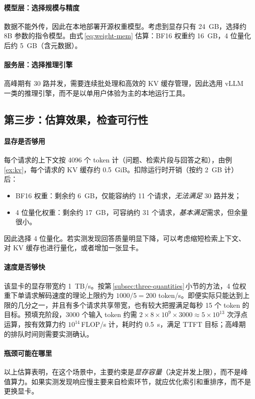 \paragraph{模型层：选择规模与精度} 数据不能外传，因此在本地部署开源权重模型。考虑到显存只有 \SI{24}{GB}，选择约 8B 参数的指令模型。由式\,\eqref{eq:weight-mem} 估算：BF16 权重约 \SI{16}{GB}，4 位量化后约 \SI{5}{GB}（含元数据）。

\paragraph{服务层：选择推理引擎} 高峰期有 30 路并发，需要连续批处理和高效的 KV 缓存管理，因此选用 vLLM 一类的推理引擎，而不是以单用户体验为主的本地运行工具。

\subsection{第三步：估算效果，检查可行性}

\paragraph{显存是否够用} 每个请求的上下文按 4096 个 token 计（问题、检索片段与回答之和），由例\,\ref{ex:kv}，每个请求的 KV 缓存约 \SI{0.5}{GiB}。扣除运行时开销（按约 \SI{2}{GB} 计）后：
\begin{itemize}
  \item BF16 权重：剩余约 \SI{6}{GB}，仅能容纳约 11 个请求，\emph{无法满足} 30 路并发；
  \item 4 位量化权重：剩余约 \SI{17}{GB}，可容纳约 31 个请求，\emph{基本满足}需求，但余量很小。
\end{itemize}
因此选择 4 位量化。若实测发现回答质量明显下降，可以考虑缩短检索上下文、对 KV 缓存也进行量化，或者增加一张显卡。

\paragraph{速度是否够快} 该显卡的显存带宽约 \SI{1}{TB/s}。按第\,\ref{subsec:three-quantities}\,小节的方法，4 位权重下单请求解码速度的理论上限约为 $1000/5=200$ token/s。即便实际只能达到上限的几分之一，并且有多个请求共享带宽，也有较大把握满足每秒 15 个 token 的目标。预填充阶段，3000 个输入 token 约需 $2\times8\times10^{9}\times3000\approx5\times10^{13}$ 次浮点运算，按有效算力约 $10^{14}$\,FLOP/s 计，耗时约 \SI{0.5}{s}，满足 TTFT 目标；高峰期的排队时间则需要实测确认。

\paragraph{瓶颈可能在哪里} 以上估算表明，在这个场景中，主要约束是\emph{显存容量}（决定并发上限），而不是峰值算力。如果实测发现响应慢主要来自检索环节，就应优化索引和重排序，而不是更换显卡。

